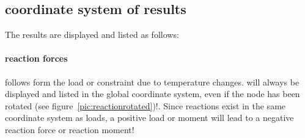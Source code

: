 \documentclass[a4paper,11pt]{report}
\begin{document}
\subsection{coordinate system of results}
The results are displayed and listed as follows:

\paragraph{reaction forces} follows form the load or constraint due to temperature changes. will always be displayed and listed in the global coordinate system, even if the node has been rotated (see figure~\ref{pic:reactionrotated})!. Since reactions exist in the same coordinate system as loads, a positive load or moment will lead to a negative reaction force or reaction moment!
\end{document}
